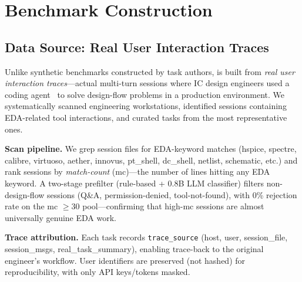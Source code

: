 \section{Benchmark Construction}
\label{sec:benchmark}

\subsection{Data Source: Real User Interaction Traces}
\label{sec:data-source}

Unlike synthetic benchmarks constructed by task authors, \bench{} is built from \emph{real user interaction traces}---actual multi-turn sessions where IC design engineers used a coding agent~\cite{cline2026} to solve design-flow problems in a production environment. We systematically scanned engineering workstations, identified sessions containing EDA-related tool interactions, and curated tasks from the most representative ones.

\textbf{Scan pipeline.} We grep session files for EDA-keyword matches (hspice, spectre, calibre, virtuoso, aether, innovus, pt\_shell, dc\_shell, netlist, schematic, etc.) and rank sessions by \emph{match-count} (mc)---the number of lines hitting any EDA keyword. A two-stage prefilter (rule-based + 0.8B LLM classifier) filters non-design-flow sessions (Q\&A, permission-denied, tool-not-found), with 0\% rejection rate on the mc $\geq 30$ pool---confirming that high-mc sessions are almost universally genuine EDA work.

\textbf{Trace attribution.} Each task records \texttt{trace\_source} (host, user, session\_file, session\_msgs, real\_task\_summary), enabling trace-back to the original engineer's workflow. User identifiers are preserved (not hashed) for reproducibility, with only API keys/tokens masked.

